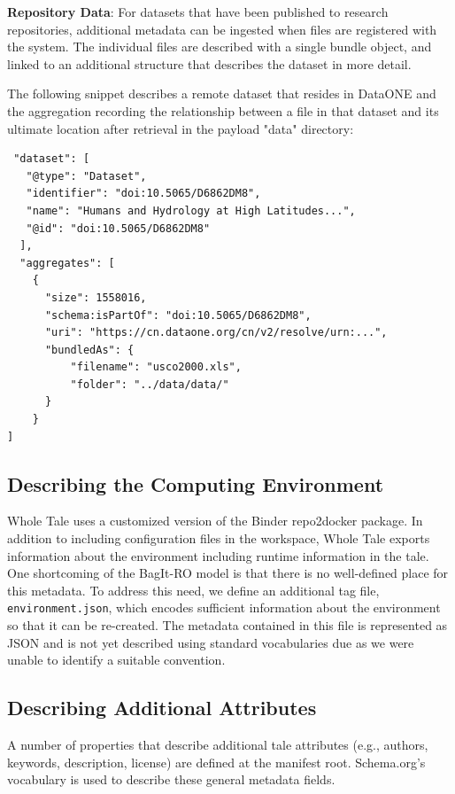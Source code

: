 \documentclass[conference]{IEEEtran}
\begin{document}
{\bf Repository Data}: 
For datasets that have been published to research repositories, additional metadata can be ingested when files are registered with the system. The individual files are described with a single bundle object, and linked to an additional structure that describes the dataset in more detail.

The following snippet describes a remote dataset that resides in DataONE and the aggregation recording the relationship between a file in that dataset and its ultimate location after 
retrieval in the payload "data" directory:


\begin{lstlisting}
 "dataset": [
   "@type": "Dataset",
   "identifier": "doi:10.5065/D6862DM8",
   "name": "Humans and Hydrology at High Latitudes...",
   "@id": "doi:10.5065/D6862DM8"
  ],
  "aggregates": [
    {
      "size": 1558016,
      "schema:isPartOf": "doi:10.5065/D6862DM8",
      "uri": "https://cn.dataone.org/cn/v2/resolve/urn:...",
      "bundledAs": {
          "filename": "usco2000.xls",
          "folder": "../data/data/"
      }
    }
]
\end{lstlisting}

\subsection{Describing the Computing Environment}
Whole Tale uses a customized version of the Binder repo2docker package. In addition to including configuration files in the workspace, Whole Tale exports information about the environment including runtime information in the tale. One shortcoming of the BagIt-RO model is that there is no well-defined place for this metadata. To address this need, we define an additional tag file, \texttt{environment.json}, which encodes sufficient information about the environment  so that it can be re-created. The metadata contained in this file is represented as JSON and is not yet described using standard vocabularies due as we were unable to identify a suitable convention.

\subsection{Describing Additional Attributes}
A number of properties that describe additional tale attributes (e.g., authors, keywords, description, license) are defined at the manifest root. Schema.org's vocabulary is used to describe these general metadata fields.
\end{document}
